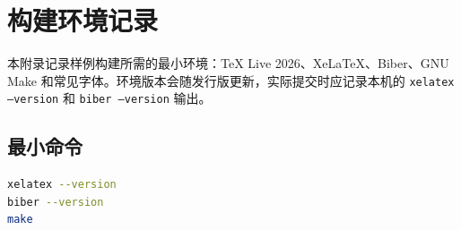 \chapter{构建环境记录}

本附录记录样例构建所需的最小环境：TeX Live 2026、XeLaTeX、Biber、GNU Make 和常见字体。环境版本会随发行版更新，实际提交时应记录本机的 \texttt{xelatex --version} 和 \texttt{biber --version} 输出。

\section{最小命令}
\begin{lstlisting}[language=bash,caption={环境检查命令}]
xelatex --version
biber --version
make
\end{lstlisting}
